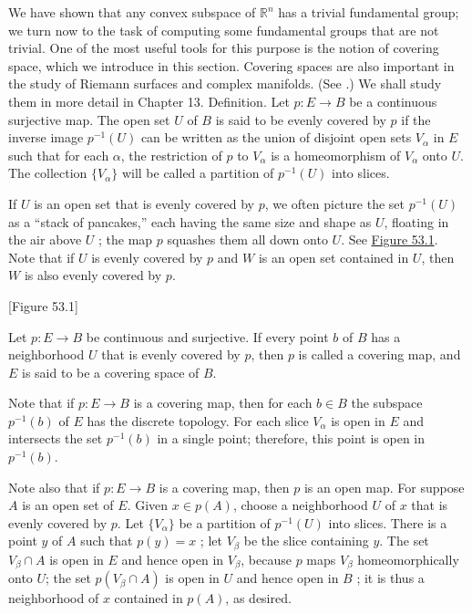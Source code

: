  We have shown that any convex subspace of \(\mathbb{R}^{n}\) has a trivial fundamental group; we turn now to the task of computing some fundamental groups that are not trivial. One of the most useful tools for this purpose is the notion of covering space, which we introduce in this section. Covering spaces are also important in the study of Riemann surfaces and complex manifolds. (See \cite{AhlforsSario1960}.) We shall study them in more detail in Chapter 13. Definition. Let \(p : E \rightarrow B\) be a continuous surjective map. The open set \(U\) of \(B\) is said to be evenly covered by \(p\) if the inverse image \(p^{-1}( U)\) can be written as the union of disjoint open sets \(V_{\alpha }\) in \(E\) such that for each \(\alpha\), the restriction of \(p\) to \(V_{\alpha }\) is a homeomorphism of \(V_{\alpha }\) onto \(U\). The collection \(\{ V_{\alpha }\}\) will be called a partition of \(p^{-1}( U)\) into slices.

If \(U\) is an open set that is evenly covered by \(p\), we often picture the set \(p^{-1}( U)\) as a ``stack of pancakes,'' each having the same size and shape as \(U\), floating in the air above \(U\) ; the map \(p\) squashes them all down onto \(U\). See \hyperref[fig:53.1]{Figure 53.1}. Note that if \(U\) is evenly covered by \(p\) and \(W\) is an open set contained in \(U\), then \(W\) is also evenly covered by \(p\).

[Figure 53.1]
\begin{definition}
Let \(p : E \rightarrow B\) be continuous and surjective. If every point \(b\) of \(B\) has a neighborhood \(U\) that is evenly covered by \(p\), then \(p\) is called a covering map, and \(E\) is said to be a covering space of \(B\).
\end{definition}

Note that if \(p : E \rightarrow B\) is a covering map, then for each \(b \in B\) the subspace \(p^{-1}( b)\) of \(E\) has the discrete topology. For each slice \(V_{\alpha }\) is open in \(E\) and intersects the set \(p^{-1}( b)\) in a single point; therefore, this point is open in \(p^{-1}( b)\).

Note also that if \(p : E \rightarrow B\) is a covering map, then \(p\) is an open map. For suppose \(A\) is an open set of \(E\). Given \(x \in p( A)\), choose a neighborhood \(U\) of \(x\) that is evenly covered by \(p\). Let \(\{ V_{\alpha }\}\) be a partition of \(p^{-1}( U)\) into slices. There is a point \(y\) of \(A\) such that \(p( y) = x\) ; let \(V_{\beta }\) be the slice containing \(y\). The set \(V_{\beta } \cap A\) is open in \(E\) and hence open in \(V_{\beta }\), because \(p\) maps \(V_{\beta }\) homeomorphically onto \(U\); the set \(p( {V_{\beta } \cap A})\) is open in \(U\) and hence open in \(B\) ; it is thus a neighborhood of \(x\) contained in \(p( A)\), as desired.

